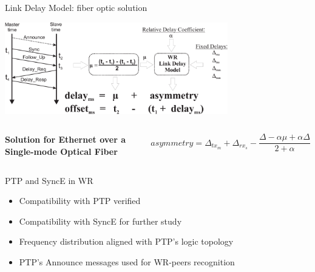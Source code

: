 \documentclass[compress,red]{beamer}
\begin{document}
\begin{frame}{Link Delay Model: fiber optic solution}

  \begin{center}
  \includegraphics[height=4cm]{protocol/wrLinkModel.pdf}
  \end{center}

  \begin{columns}[c]
  \column{1.5in}

    \begin{center}
      \textbf{Solution for Ethernet over a Single-mode Optical Fiber}
    \end{center}    

  \column{2.7in}

    \begin{equation}
      \nonumber asymmetry = \Delta_{tx_m} + \Delta_{rx_s} - \frac{\Delta - \alpha \mu + \alpha \Delta}{2 + \alpha}
    \end{equation}

  \end{columns}

\end{frame}
\begin{frame}{PTP and SyncE in WR}

  \begin{itemize}
    \item Compatibility with PTP verified
    \item Compatibility with SyncE for further study
    \item Frequency distribution aligned with PTP's logic topology
    \item PTP's Announce messages used for WR-peers recognition
  \end{itemize}

\end{frame}
\end{document}
